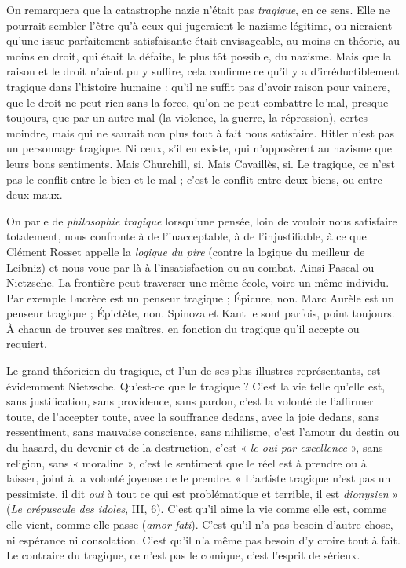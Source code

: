 On remarquera que la catastrophe nazie n’était pas {\it tragique}, en ce sens.
Elle ne pourrait sembler l’être qu’à ceux qui jugeraient le nazisme légitime,
ou nieraient qu'une issue parfaitement satisfaisante était envisageable, au
moins en théorie, au moins en droit, qui était la défaite, le plus tôt possible,
du nazisme. Mais que la raison et le droit n’aient pu y suffire, cela confirme
ce qu’il y a d’irréductiblement tragique dans l’histoire humaine : qu’il ne
suffit pas d’avoir raison pour vaincre, que le droit ne peut rien sans la force,
qu’on ne peut combattre le mal, presque toujours, que par un autre mal (la
violence, la guerre, la répression), certes moindre, mais qui ne saurait non
plus tout à fait nous satisfaire. Hitler n’est pas un personnage tragique. Ni
ceux, s’il en existe, qui n’opposèrent au nazisme que leurs bons sentiments.
Mais Churchill, si. Mais Cavaillès, si. Le tragique, ce n’est pas le conflit entre
le bien et le mal ; c’est le conflit entre deux biens, ou entre deux maux.

On parle de {\it philosophie tragique} lorsqu’une pensée, loin de vouloir nous
satisfaire totalement, nous confronte à de l’inacceptable, à de l’injustifiable, à ce
que Clément Rosset appelle la {\it logique du pire} (contre la logique du meilleur de
Leibniz) et nous voue par là à l’insatisfaction ou au combat. Ainsi Pascal ou
Nietzsche. La frontière peut traverser une même école, voire un même individu.
Par exemple Lucrèce est un penseur tragique ; Épicure, non. Marc Aurèle
est un penseur tragique ; Épictète, non. Spinoza et Kant le sont parfois, point
toujours. À chacun de trouver ses maîtres, en fonction du tragique qu’il accepte
ou requiert.

Le grand théoricien du tragique, et l’un de ses plus illustres représentants,
est évidemment Nietzsche. Qu'est-ce que le tragique ? C’est la vie telle qu’elle
est, sans justification, sans providence, sans pardon, c’est la volonté de
l’affirmer toute, de l’accepter toute, avec la souffrance dedans, avec la joie
dedans, sans ressentiment, sans mauvaise conscience, sans nihilisme, c’est
l'amour du destin ou du hasard, du devenir et de la destruction, c’est « {\it le oui
par excellence} », sans religion, sans « moraline », c’est le sentiment que le réel est
à prendre ou à laisser, joint à la volonté joyeuse de le prendre. « L'artiste tragique
n’est pas un pessimiste, il dit {\it oui} à tout ce qui est problématique et terrible,
il est {\it dionysien} » ({\it Le crépuscule des idoles}, III, 6). C’est qu’il aime la vie
comme elle est, comme elle vient, comme elle passe ({\it amor fati}). C’est qu’il n’a
pas besoin d’autre chose, ni espérance ni consolation. C’est qu’il n’a même pas
besoin d’y croire tout à fait. Le contraire du tragique, ce n’est pas le comique,
c’est l’esprit de sérieux.

